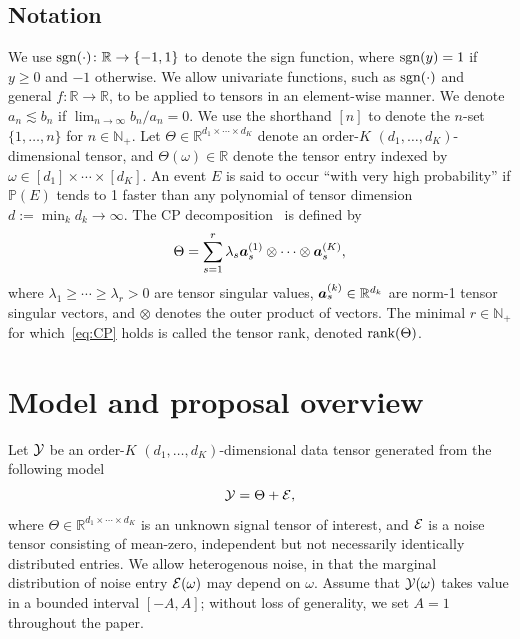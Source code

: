 \documentclass[11pt]{article}
\theoremstyle{plain}
\theoremstyle{definition}
\def\sign{\textup{sgn}}
\def\rank{\textup{rank}}
\begin{document}
\subsection{Notation}
We use $\sign(\cdot)\colon \mathbb{R}\to\{-1,1\}$ to denote the sign function, where $\sign(y)=1$ if $y\geq 0$ and $-1$ otherwise. We allow univariate functions, such as $\sign(\cdot)$ and general $f\colon \mathbb{R}\to\mathbb{R}$, to be applied to tensors in an element-wise manner. 
We denote $a_n\lesssim b_n$ if $\lim_{n\to \infty} b_n/a_n=0$. We use the shorthand $[n]$ to denote the $n$-set $\{1,\ldots,n\}$ for $n\in\mathbb{N}_{+}$. Let $\Theta\in\mathbb{R}^{d_1\times \cdots \times d_K}$ denote an order-$K$ $(d_1,\ldots,d_K)$-dimensional tensor, and $\Theta(\omega)\in\mathbb{R}$ denote the tensor entry indexed by $\omega \in[d_1]\times \cdots \times [d_K]$. An event $E$ is said to occur ``with very high probability'' if $\mathbb{P}(E)$ tends to 1 faster than any polynomial of tensor dimension $d:=\min_k d_k \to\infty$. The CP decomposition~\citep{hitchcock1927expression} is defined by
\begin{equation}\label{eq:CP}
\Theta=\sum_{s=1}^r\lambda_s \bm{a}^{(1)}_s\otimes\cdots\otimes \bm{a}^{(K)}_s,
\end{equation}
where $\lambda_1\geq \cdots \geq \lambda_r>0$ are tensor singular values, $\bm{a}^{(k)}_s\in\mathbb{R}^{d_k}$ are norm-1 tensor singular vectors, and $\otimes$ denotes the outer product of vectors. The minimal $r\in\mathbb{N}_{+}$ for which~\eqref{eq:CP} holds is called the tensor rank, denoted $\rank(\Theta)$.  


\section{Model and proposal overview}\label{sec:overview}
Let $\mathcal{Y}$ be an order-$K$ $(d_1,\ldots,d_K)$-dimensional data tensor generated from the following model
\begin{equation}\label{eq:model}
\mathcal{Y}=\Theta+\mathcal{E},
\end{equation}
where $\Theta\in\mathbb{R}^{d_1\times \cdots \times d_K}$ is an unknown signal tensor of interest, and $\mathcal{E}$ is a noise tensor consisting of mean-zero, independent but not necessarily identically distributed entries. We allow heterogenous noise, in that the marginal distribution of noise entry $\mathcal{E}(\omega)$ may depend on $\omega$. Assume that $\mathcal{Y}(\omega)$ takes value in a bounded interval $[-A, A]$; without loss of generality, we set $A=1$ throughout the paper.  
\end{document}

